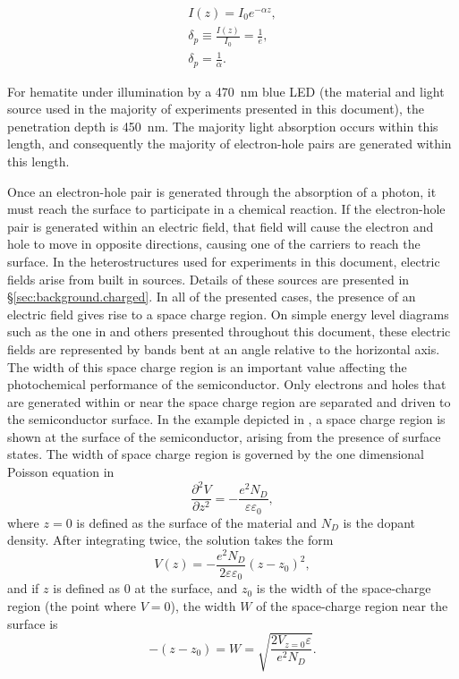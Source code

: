 \begin{gather}
	\label{eq:beerlambert}
	I(z)=I_{0}e^{-\alpha z},\\
	\label{eq:definepenetrationdepth}
	\delta_{p} \equiv \frac{I(z)}{I_{0}}=\frac{1}{e},\\
	\label{eq:oneoveralpha}
	\delta_{p} = \frac{1}{\alpha}.
\end{gather}

For hematite under illumination by a \SI{470}{\nano\meter} blue LED (the material and light source used in the majority of experiments presented in this document), the penetration depth is \texttildelow\SI{450}{\nano\meter}.\cite{Marusak:1980gc} The majority light absorption occurs within this length, and consequently the majority of electron-hole pairs are generated within this length.

Once an electron-hole pair is generated through the absorption of a photon, it must reach the surface to participate in a chemical reaction. If the electron-hole pair is generated within an electric field,  that field will cause the electron and hole to move in opposite directions, causing one of the carriers to reach the surface. In the heterostructures used for experiments in this document, electric fields arise from built in sources. Details of these sources are presented in \S\ref{sec:background.charged}. In all of the presented cases, the presence of an electric field gives rise to a space charge region. On simple energy level diagrams such as the one in  and others presented throughout this document, these electric fields are represented by bands bent at an angle relative to the horizontal axis. The width of this space charge region is an important value affecting the photochemical performance of the semiconductor. Only electrons and holes that are generated within or near the space charge region are separated and driven to the semiconductor surface. In the example depicted in , a space charge region is shown at the surface of the semiconductor, arising from the presence of surface states. The width of space charge region is governed by the one dimensional Poisson equation in 
\begin{equation}
	\label{eq:poisson}
	\frac{\partial^{2}V}{{\partial}z^{2}}=-\frac{e^{2}N_{D}}{\varepsilon \varepsilon_{0}},
\end{equation}
where $z=0$ is defined as the surface of the material and $N_{D}$ is the dopant density. After integrating twice, the solution takes the form
\begin{equation}
	\label{eq:poissonsolved}
	V(z)=-\frac{e^{2}N_{D}}{2\varepsilon \varepsilon_{0}}(z-z_{0})^{2},
\end{equation}
and if $z$ is defined as 0 at the surface, and $z_{0}$ is the width of the space-charge region (the point where $V=0$), the width $W$ of the space-charge region near the surface is
\begin{equation}
	\label{eq:spacechargewidth}
	-(z-z_{0})=W=\sqrt{\frac{2V_{z=0}\varepsilon}{e^{2}N_{D}}}\text{.}
\end{equation}

